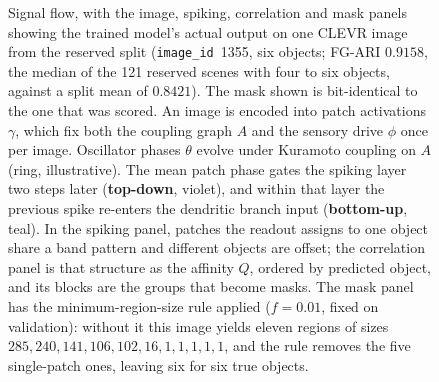 \begin{figure}[!t]
\caption{%
Signal flow, with the image, spiking, correlation and mask panels showing the trained model's
actual output on one CLEVR image from the reserved split (\texttt{image\_id}~1355, six objects;
FG-ARI $0.9158$, the median of the 121 reserved scenes with four to six objects, against a
split mean of $0.8421$). The mask shown is bit-identical to the one that was scored. An image
is encoded into patch activations $\gamma$, which fix both the coupling graph $A$ and the
sensory drive $\phi$ once per image. Oscillator phases $\theta$ evolve under Kuramoto coupling
on $A$ (ring, illustrative). The mean patch phase gates the spiking layer two steps later
(\textbf{top-down}, violet), and within that layer the previous spike re-enters the dendritic
branch input (\textbf{bottom-up}, teal). In the spiking panel, patches the readout assigns to
one object share a band pattern and different objects are offset; the correlation panel is
that structure as the affinity $Q$, ordered by predicted object, and its blocks are the
groups that become masks. The mask panel has the minimum-region-size rule applied
($f=0.01$, fixed on validation): without it this image yields eleven regions of sizes
$285, 240, 141, 106, 102, 16, 1, 1, 1, 1, 1$, and the rule removes the five single-patch
ones, leaving six for six true objects.}
\label{fig:architecture}
\end{figure}
